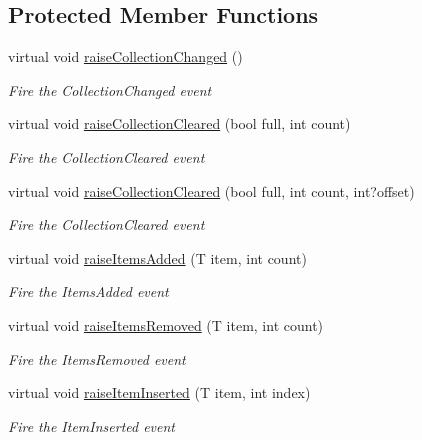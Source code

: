 \subsection*{Protected Member Functions}
\begin{DoxyCompactItemize}
\item 
virtual void \hyperlink{class_c5_1_1_collection_value_base_a2479d8737c18958f6c725a0e38397825}{raise\+Collection\+Changed} ()
\begin{DoxyCompactList}\small\item\em Fire the Collection\+Changed event \end{DoxyCompactList}\item 
virtual void \hyperlink{class_c5_1_1_collection_value_base_a923cee6b9d57bf1694a070b21613f030}{raise\+Collection\+Cleared} (bool full, int count)
\begin{DoxyCompactList}\small\item\em Fire the Collection\+Cleared event \end{DoxyCompactList}\item 
virtual void \hyperlink{class_c5_1_1_collection_value_base_abcddaf7f4d7f64d41854e01dffd828ce}{raise\+Collection\+Cleared} (bool full, int count, int?offset)
\begin{DoxyCompactList}\small\item\em Fire the Collection\+Cleared event \end{DoxyCompactList}\item 
virtual void \hyperlink{class_c5_1_1_collection_value_base_a5c092cb991bc12200e7b893391fd8c38}{raise\+Items\+Added} (T item, int count)
\begin{DoxyCompactList}\small\item\em Fire the Items\+Added event \end{DoxyCompactList}\item 
virtual void \hyperlink{class_c5_1_1_collection_value_base_ade345c3e3c0d38d9694b569831a09752}{raise\+Items\+Removed} (T item, int count)
\begin{DoxyCompactList}\small\item\em Fire the Items\+Removed event \end{DoxyCompactList}\item 
virtual void \hyperlink{class_c5_1_1_collection_value_base_a053613a6d6d27e8cd2ad176b50b21b83}{raise\+Item\+Inserted} (T item, int index)
\begin{DoxyCompactList}\small\item\em Fire the Item\+Inserted event \end{DoxyCompactList}\item 

\end{DoxyCompactItemize}
